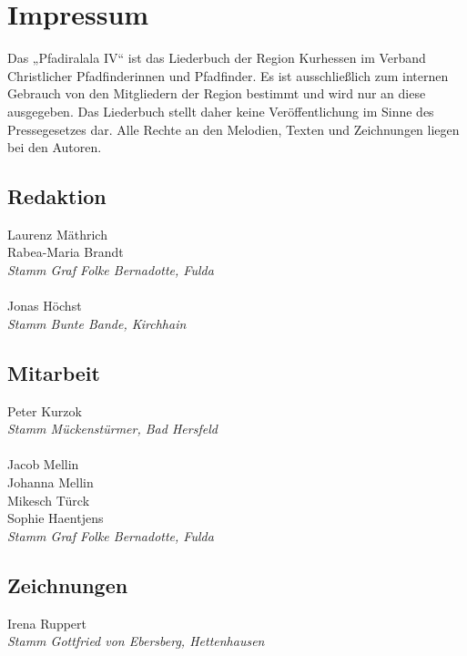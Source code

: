 \section*{Impressum}

\vspace{10pt} Das „Pfadiralala IV“ ist das Liederbuch der Region Kurhessen im Verband Christlicher Pfadfinderinnen und Pfadfinder. Es ist ausschließlich zum internen Gebrauch von den Mitgliedern der Region bestimmt und wird nur an diese ausgegeben. Das Liederbuch stellt daher keine Veröffentlichung im Sinne des Pressegesetzes dar. Alle Rechte an den Melodien, Texten und Zeichnungen liegen bei den Autoren. \\ \vspace{10pt} 

\begin{centering}
\begin{multicols}{2}

\subsection*{Redaktion}
Laurenz Mäthrich \\ Rabea-Maria Brandt \\ \textit{Stamm Graf Folke Bernadotte, Fulda} \\ ~\\
Jonas Höchst \\ \textit{Stamm Bunte Bande, Kirchhain} \\

\subsection*{Mitarbeit}
Peter Kurzok \\ \textit{Stamm Mückenstürmer, Bad Hersfeld} \\ ~\\
Jacob Mellin \\ Johanna Mellin \\ Mikesch Türck \\ Sophie Haentjens \\ \textit{Stamm Graf Folke Bernadotte, Fulda} \\

\vfill\null
\columnbreak

\subsection*{Zeichnungen}
Irena Ruppert \\ \textit{Stamm Gottfried von Ebersberg, Hettenhausen} \\ ~\\


\end{multicols}
\end{centering}
